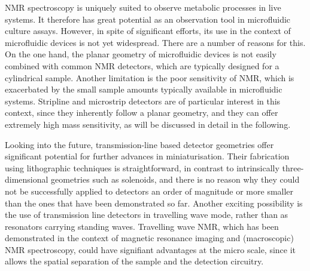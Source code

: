 NMR spectroscopy is uniquely suited to observe metabolic processes in live systems. It therefore has 
great potential as an observation tool in microfluidic culture assays. However, in spite of significant 
efforts, its use in the context of microfluidic devices is not yet widespread. There are a number of 
reasons for this. On the one hand, the planar geometry of microfluidic devices is not easily combined 
with common NMR detectors, which are typically designed for a cylindrical sample. Another limitation is 
the poor sensitivity of NMR, which is exacerbated by the small sample amounts typically available in 
microfluidic systems. Stripline and microstrip detectors are of 
particular interest in this context, since they inherently follow a planar geometry, and they can offer 
extremely high mass sensitivity, as will be discussed in detail in the following.

Looking into the future, transmission-line based detector geometries offer significant potential for further 
advances in miniaturisation. Their fabrication using lithographic techniques is straightforward, in 
contrast to intrinsically three-dimensional geometries such as solenoids, and there is no reason why 
they could not be successfully applied to detectors an order of magnitude or more smaller than the ones 
that have been demonstrated so far. Another exciting possibility is the use of transmission line detectors in 
travelling wave mode, rather than as resonators carrying standing waves. Travelling wave NMR, which 
has been demonstrated in the context of magnetic resonance imaging and (macroscopic) NMR spectroscopy, 
could have signifiant advantages at the micro scale, since it allows the spatial separation of the 
sample and the detection circuitry. 
